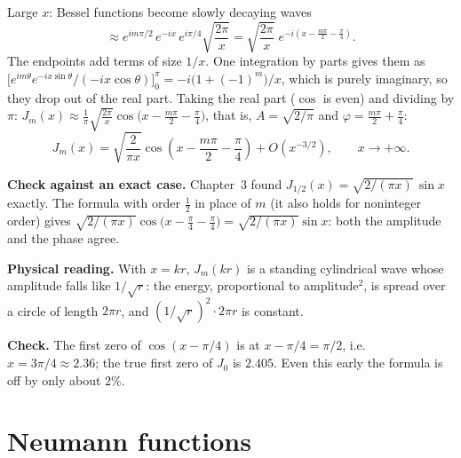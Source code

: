 \documentclass[11pt]{beamer}
\begin{document}
\begin{frame}[allowframebreaks=1.00]{Large $x$: Bessel functions become slowly decaying waves}
\[ \approx e^{im\pi/2}\,e^{-ix}\,e^{i\pi/4}\sqrt{\frac{2\pi}{x}}
 =\sqrt{\frac{2\pi}{x}}\;e^{-i(x-\frac{m\pi}2-\frac\pi4)} .
\]
The endpoints add terms of size \(1/x\). One integration by parts gives them as
\(\bigl[e^{im\theta}e^{-ix\sin\theta}/(-ix\cos\theta)\bigr]_0^\pi=-i\bigl(1+(-1)^m\bigr)/x\), which is purely imaginary,
so they drop out of the real part. Taking the real part (\(\cos\) is even) and dividing by \(\pi\):
\(J_m(x)\approx\frac1\pi\sqrt{\frac{2\pi}{x}}\cos\bigl(x-\frac{m\pi}2-\frac\pi4\bigr)\), that is, \(A=\sqrt{2/\pi}\) and
\(\varphi=\frac{m\pi}2+\frac\pi4\):
\begin{equation}
 J_m(x)=\sqrt{\frac2{\pi x}}
       \cos\left(x-\frac{m\pi}{2}-\frac\pi4\right)+O(x^{-3/2}),
 \qquad x\to+\infty .
 \label{eq:largex}
\end{equation}
\par\framebreak\par
\textbf{Check against an exact case.} Chapter~3 found \(J_{1/2}(x)=\sqrt{2/(\pi x)}\,\sin x\) exactly. The formula
with order \(\frac12\) in place of \(m\) (it also holds for noninteger order) gives \(\sqrt{2/(\pi x)}\cos\bigl(x-\frac\pi4-\frac\pi4\bigr)=\sqrt{2/(\pi x)}\sin x\): both the amplitude and the
phase agree.

\textbf{Physical reading.} With \(x=kr\), \(J_m(kr)\) is a standing cylindrical wave whose amplitude falls
like \(1/\sqrt r\): the energy, proportional to amplitude\(^2\), is spread over a circle of length \(2\pi r\),
and \((1/\sqrt r)^2\cdot2\pi r\) is constant.

\textbf{Check.} The first zero of \(\cos(x-\pi/4)\) is at \(x-\pi/4=\pi/2\), i.e.\ \(x=3\pi/4\approx2.36\); the
true first zero of \(J_0\) is \(2.405\). Even this early the formula is off by only about \(2\%\).
\end{frame}


\section{Neumann functions}
\end{document}
